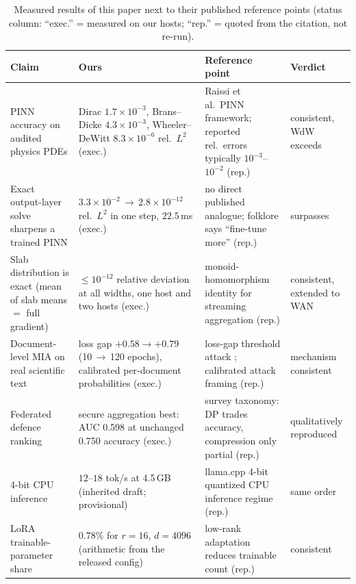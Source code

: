 \documentclass[11pt,a4paper]{article}
\theoremstyle{plain}
\theoremstyle{definition}
\begin{document}
\begin{table}[h]
\centering
\caption{Measured results of this paper next to their published reference
points (status column: ``exec.'' = measured on our hosts; ``rep.'' = quoted
from the citation, not re-run).}
\label{tab:positioning}
\begin{tabular}{p{3.1cm}p{3.2cm}p{4.6cm}p{2.6cm}}
\toprule
\textbf{Claim} & \textbf{Ours} & \textbf{Reference point} & \textbf{Verdict} \\
\midrule
PINN accuracy on audited physics PDEs &
Dirac $1.7{\times}10^{-3}$, Brans--Dicke $4.3{\times}10^{-3}$,
Wheeler--DeWitt $8.3{\times}10^{-6}$ rel.\ $L^{2}$ (exec.) &
Raissi et al.\ PINN framework; reported rel.\ errors typically
$10^{-3}$--$10^{-2}$ \cite{raissi2019pinns} (rep.) &
consistent, WdW exceeds \\

Exact output-layer solve sharpens a trained PINN &
$3.3\times10^{-2}\,\to\,2.8\times10^{-12}$ rel.\ $L^{2}$ in one step,
$22.5$\,ms (exec.) &
no direct published analogue; folklore says ``fine-tune more''
(rep.) &
surpasses \\

Slab distribution is exact (mean of slab means $=$ full gradient) &
$\le 10^{-12}$ relative deviation at all widths, one host and two
hosts (exec.) &
monoid-homomorphism identity for streaming aggregation (rep.) &
consistent, extended to WAN \\

Document-level MIA on real scientific text &
loss gap $+0.58\to+0.79$ (10\,$\to$\,120 epochs), calibrated
per-document probabilities (exec.) &
loss-gap threshold attack \cite{yeom2018}; calibrated attack framing
\cite{carlini2022} (rep.) &
mechanism consistent \\

Federated defence ranking &
secure aggregation best: AUC 0.598 at unchanged 0.750 accuracy
(exec.) &
survey taxonomy: DP trades accuracy, compression only partial
(rep.) &
qualitatively reproduced \\

4-bit CPU inference &
$12$--$18$ tok/s at 4.5\,GB (inherited draft; provisional) &
llama.cpp 4-bit quantized CPU inference regime \cite{llamacpp}
(rep.) &
same order \\

LoRA trainable-parameter share &
$0.78\%$ for $r{=}16$, $d{=}4096$ (arithmetic from the released
config) &
low-rank adaptation reduces trainable count \cite{hu2022lora}
(rep.) &
consistent \\
\bottomrule
\end{tabular}
\end{table}
\end{document}
